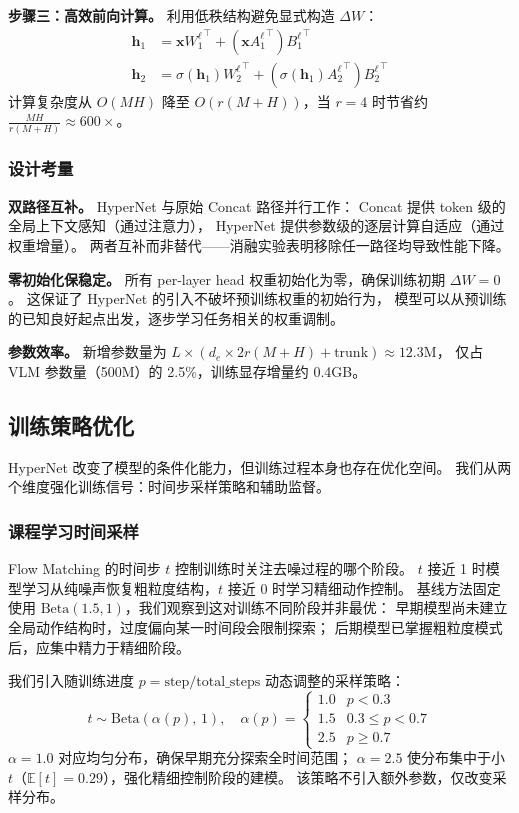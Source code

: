 \documentclass[10pt,twocolumn]{ctexart}
\begin{document}
\textbf{步骤三：高效前向计算。}
利用低秩结构避免显式构造 $\Delta W$：
\begin{align}
    \mathbf{h}_1 &= \mathbf{x} {W_1^\ell}^\top + (\mathbf{x} {A_1^\ell}^\top) {B_1^\ell}^\top \\
    \mathbf{h}_2 &= \sigma(\mathbf{h}_1) {W_2^\ell}^\top + (\sigma(\mathbf{h}_1) {A_2^\ell}^\top) {B_2^\ell}^\top
\end{align}
计算复杂度从 $O(MH)$ 降至 $O(r(M+H))$，当 $r=4$ 时节省约 $\frac{MH}{r(M+H)} \approx 600\times$。

\subsubsection{设计考量}

\textbf{双路径互补。}
HyperNet 与原始 Concat 路径并行工作：
Concat 提供 token 级的全局上下文感知（通过注意力），
HyperNet 提供参数级的逐层计算自适应（通过权重增量）。
两者互补而非替代——消融实验表明移除任一路径均导致性能下降。

\textbf{零初始化保稳定。}
所有 per-layer head 权重初始化为零，确保训练初期 $\Delta W = 0$。
这保证了 HyperNet 的引入不破坏预训练权重的初始行为，
模型可以从预训练的已知良好起点出发，逐步学习任务相关的权重调制。

\textbf{参数效率。}
新增参数量为 $L \times (d_e \times 2r(M+H) + \text{trunk}) \approx 12.3\text{M}$，
仅占 VLM 参数量（500M）的 2.5\%，训练显存增量约 0.4GB。

\subsection{训练策略优化}\label{sec:training}

HyperNet 改变了模型的条件化能力，但训练过程本身也存在优化空间。
我们从两个维度强化训练信号：时间步采样策略和辅助监督。

\subsubsection{课程学习时间采样}

Flow Matching 的时间步 $t$ 控制训练时关注去噪过程的哪个阶段。
$t$ 接近 1 时模型学习从纯噪声恢复粗粒度结构，$t$ 接近 0 时学习精细动作控制。
基线方法固定使用 $\text{Beta}(1.5, 1)$，我们观察到这对训练不同阶段并非最优：
早期模型尚未建立全局动作结构时，过度偏向某一时间段会限制探索；
后期模型已掌握粗粒度模式后，应集中精力于精细阶段。

我们引入随训练进度 $p = \text{step}/\text{total\_steps}$ 动态调整的采样策略：
\begin{equation}
    t \sim \text{Beta}(\alpha(p),\, 1), \quad
    \alpha(p) = \begin{cases}
        1.0 & p < 0.3 \\
        1.5 & 0.3 \le p < 0.7 \\
        2.5 & p \ge 0.7
    \end{cases}
\end{equation}
$\alpha=1.0$ 对应均匀分布，确保早期充分探索全时间范围；
$\alpha=2.5$ 使分布集中于小 $t$（$\mathbb{E}[t]=0.29$），强化精细控制阶段的建模。
该策略不引入额外参数，仅改变采样分布。
\end{document}
